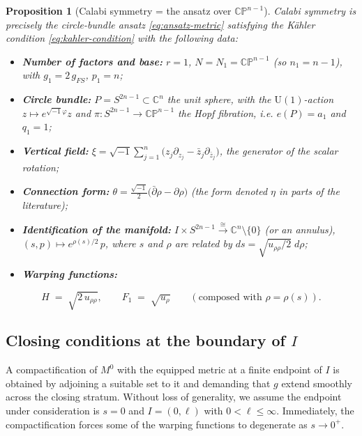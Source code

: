 \documentclass[11pt]{amsart}
\theoremstyle{plain}
\numberwithin{equation}{section}
\newtheorem{proposition}[theorem]{Proposition}
\theoremstyle{definition}
\theoremstyle{remark}
\begin{document}
\begin{proposition}[Calabi symmetry = the ansatz over $\mathbb{CP}^{n-1}$]\label{prop:calabi-ansatz}
	Calabi symmetry is precisely the circle-bundle ansatz \eqref{eq:ansatz-metric} satisfying the Kähler condition \eqref{eq:kahler-condition} with the following data:
	
	\begin{itemize}
		\item \textbf{Number of factors and base:} $r = 1$, $N = N_1 = \mathbb{CP}^{n-1}$ (so $n_1 = n - 1$), with $g_1 = 2\, g_{FS}$, $p_1 = n$;
		\item \textbf{Circle bundle:} $P = S^{2n-1} \subset \mathbb{C}^n$ the unit sphere, with the $\mathrm{U}(1)$-action $z \mapsto e^{\sqrt{-1}\varphi} z$ and $\pi : S^{2n-1} \to \mathbb{CP}^{n-1}$ the Hopf fibration, i.e. $e(P) = a_1$ and $q_1 = 1$;
		\item \textbf{Vertical field:} $\xi = \sqrt{-1} \sum_{j=1}^n \big( z_j \partial_{z_j} - \bar{z}_j \partial_{\bar{z}_j} \big)$, the generator of the scalar rotation;
		\item \textbf{Connection form:} $\theta = \frac{\sqrt{-1}}{2} \big( \bar{\partial}\rho - \partial\rho \big)$ (the form denoted $\eta$ in parts of the literature);
		\item \textbf{Identification of the manifold:} $I \times S^{2n-1} \xrightarrow{\;\cong\;} \mathbb{C}^n \setminus \{0\}$ (or an annulus), $(s, p) \mapsto e^{\rho(s)/2}\, p$, where $s$ and $\rho$ are related by $ds = \sqrt{u_{\rho\rho}/2}\; d\rho$;
		\item \textbf{Warping functions:}
	\end{itemize}
	
	\begin{equation}\label{eq:calabi-metric}
		H \;=\; \sqrt{2\, u_{\rho\rho}}, \qquad F_1 \;=\; \sqrt{u_{\rho}} \qquad (\text{composed with } \rho = \rho(s)).
	\end{equation}
	
\end{proposition}
\fi

\subsection{Closing conditions at the boundary of $I$}\label{subsec:closing}
A compactification of $M^0$ with the equipped metric at a finite endpoint of $I$ is obtained by adjoining a suitable set to it and demanding that $g$ extend smoothly across the closing stratum. Without loss of generality, we assume the endpoint under consideration is $s = 0$ and $I = (0, \ell)$ with $0 < \ell \leq \infty$. Immediately, the compactification forces some of the warping functions to degenerate as $s \rightarrow 0^+$. 
\end{document}
